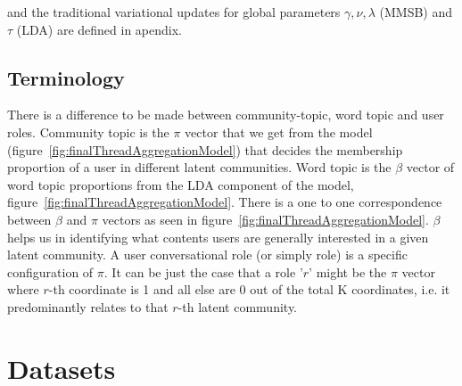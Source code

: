 \documentclass{sig-alternate}
\begin{document}
\normalsize
and the traditional variational updates for global parameters $\gamma, \nu, \lambda$
(MMSB) and $\tau$ (LDA) are defined in apendix.
\vspace*{-0.5\baselineskip}
\subsection{Terminology} 
\label{sec:term}
There is a difference to be made between
community-topic, word topic and user roles. Community topic is the 
$\pi$ vector that we get from
the model (figure~\ref{fig:finalThreadAggregationModel}) that decides the 
membership proportion of a user in
different latent communities. Word topic is the $\beta$ vector of word topic
proportions from the LDA component of the model,
figure~\ref{fig:finalThreadAggregationModel}. There is a one to one
correspondence between $\beta$ and $\pi$ vectors as seen in
figure~\ref{fig:finalThreadAggregationModel}. $\beta$ helps us in identifying
what contents users are generally interested in a given latent community.
 A user conversational role (or simply role) is a specific 
 configuration of $\pi$. It can be just the case
that a role '$r$' might be the $\pi$ vector where $r$-th coordinate is 1
and all else are 0 out of the total K coordinates, i.e. it predominantly relates
to that $r$-th latent community.


\section{Datasets}
\label{sec:dataset}
\end{document}
